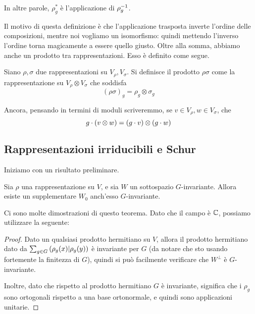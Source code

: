 	In altre parole, $\rho^*_g$ è l'applicazione  di $\rho_g^{-1}$.

	Il motivo di questa definizione è che l'applicazione trasposta inverte l'ordine delle composizioni, mentre noi vogliamo un isomorfismo: quindi mettendo l'inverso l'ordine torna magicamente a essere quello giusto.
	Oltre alla somma, abbiamo anche un prodotto tra rappresentazioni. Esso è definito come segue. 

	\begin{mydef}\label{def:RapprProd}
		Siano $\rho,\sigma$ due rappresentazioni su $V_\rho,V_\sigma$. Si definisce il prodotto $\rho\sigma$ come la rappresentazione su $V_\rho \otimes V_\sigma$ che soddisfa
		\[
			(\rho\sigma)_g = \rho_g \otimes \sigma_g
		\]
		
		Ancora, pensando in termini di moduli scriveremmo, se $v\in V_\rho, w\in V_\sigma$, che
		\[
		 g\cdot (v\otimes w) = (g\cdot v) \otimes (g\cdot w)
		\]

	\end{mydef}
	




	\subsection{Rappresentazioni irriducibili e Schur}

	Iniziamo con un risultato preliminare.

	\begin{mytheorem}[Maschke]\label{Th:SupplInv}
		Sia $\rho$ una rappresentazione su $V$, e sia $W$ un sottospazio $G$-invariante. Allora esiste un supplementare $W_0$ anch'esso $G$-invariante.
	\end{mytheorem}
	
	Ci sono molte dimostrazioni di questo teorema. Dato che il campo è $\mathbb C$, possiamo utilizzare la seguente:
	\begin{proof}
		Dato un qualsiasi prodotto hermitiano su $V$, allora il prodotto hermitiano dato da $\sum_{g\in G}\left(\rho_g(x) | \rho_g(y)\right)$ è invariante per $G$ (da notare che sto usando fortemente la finitezza di $G$), quindi si può facilmente verificare che $W^\perp$ è $G$-invariante.
		
		Inoltre, dato che rispetto al prodotto hermitiano $G$ è invariante, significa che i $\rho_g$ sono ortogonali rispetto a una base ortonormale, e quindi sono applicazioni unitarie.
	\end{proof}


